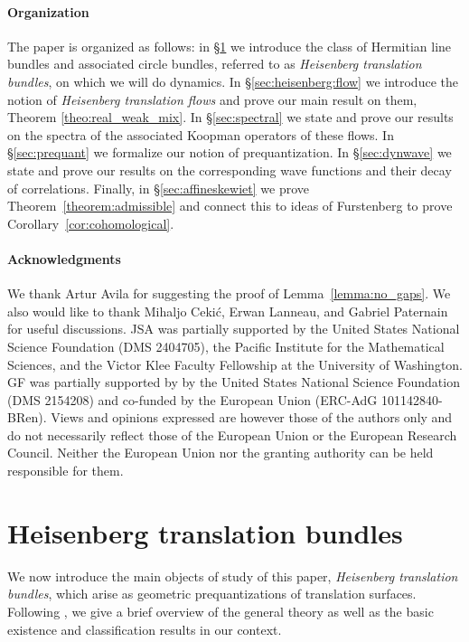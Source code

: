 \documentclass{amsart}
\theoremstyle{definition}
\theoremstyle{remark}
\numberwithin{equation}{section}
\newcommand{\<}{{\langle}}
\renewcommand{\>}{{\rangle}}
\begin{document}
\paragraph*{\bf Organization} The paper is organized as follows: in \S\ref{sec:heisenberg} we introduce the class of Hermitian line bundles and associated circle bundles, referred to as \textit{Heisenberg translation bundles}, on which we will do dynamics. In \S\ref{sec:heisenberg:flow} we introduce the notion of \textit{Heisenberg translation flows} and prove our main result on them, Theorem \ref{theo:real_weak_mix}. In \S\ref{sec:spectral} we state and prove our results on the spectra of the associated Koopman operators of these flows. In \S\ref{sec:prequant} we formalize our notion of prequantization. In \S\ref{sec:dynwave} we state and prove our results on the corresponding wave functions and their decay of correlations. Finally, in \S\ref{sec:affineskewiet} we prove Theorem~\ref{theorem:admissible} and connect this to ideas of Furstenberg to prove Corollary~\ref{cor:cohomological}. \\

\paragraph*{\bf Acknowledgments} We thank Artur Avila for suggesting the proof of Lemma~\ref{lemma:no_gaps}. We also would like to thank Mihaljo Ceki\'c, Erwan Lanneau, and Gabriel Paternain for useful discussions.  JSA was partially supported by the United States National Science Foundation (DMS 2404705), the Pacific Institute for the Mathematical Sciences, and the Victor Klee Faculty Fellowship at the University of Washington. GF was partially supported by by the United States National Science Foundation (DMS 2154208) and co-funded by the European Union (ERC-AdG 101142840-BRen). Views and opinions expressed are however those of the authors only and do not necessarily reflect those of the European Union or the European Research Council. Neither the European Union nor the granting authority can be held responsible for them.

\section{Heisenberg translation bundles}\label{sec:heisenberg}

We now introduce the main objects of study of this paper, \textit{Heisenberg translation bundles}, which arise as geometric prequantizations of translation surfaces. Following \cite{quant}, we give a brief overview of the general theory as well as the basic existence and classification results in our context.
\end{document}
